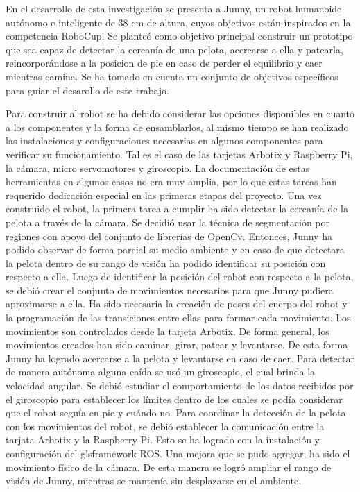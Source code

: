 En el desarrollo de esta investigaci\'on se presenta a Junny, un robot humanoide aut\'onomo e inteligente de 38 cm de altura, cuyos objetivos están inspirados en la competencia RoboCup. Se planteó como objetivo principal construir un prototipo que sea capaz de detectar la cercanía de una pelota, acercarse a ella y patearla, reincorpor\'andose a la posicion de pie en caso de perder el equilibrio y caer mientras camina. Se ha tomado en cuenta un conjunto de objetivos específicos para guiar el desarollo de este trabajo. %

Para construir al robot se ha debido considerar las opciones disponibles en cuanto a los componentes y la forma de ensamblarlos, al mismo tiempo se han realizado las instalaciones y configuraciones necesarias en algunos componentes para verificar su funcionamiento. Tal es el caso de las tarjetas Arbotix y Raspberry Pi, la cámara, micro servomotores y giroscopio. La documentación de estas herramientas en algunos casos no era muy amplia, por lo que estas tareas han requerido dedicación especial en las primeras etapas del proyecto. 
Una vez construido el robot, la primera tarea a cumplir ha sido detectar la cercanía de la pelota a través de la cámara. Se decidió usar la técnica de segmentación por regiones con apoyo del conjunto de librerías de OpenCv. Entonces, Junny ha podido observar de forma parcial su medio ambiente y en caso de que detectara la pelota dentro de su rango de visión ha podido identificar su posición con respecto a ella. 
Luego de identificar la posición del robot con respecto a la pelota, se debió crear el conjunto de movimientos necesarios para que Junny pudiera aproximarse a ella. Ha sido necesaria la creación de poses del cuerpo del robot y la programación de las transiciones entre ellas para formar cada movimiento. Los movimientos son controlados desde la tarjeta Arbotix. De forma general, los movimientos creados han sido caminar, girar, patear y levantarse. De esta forma Junny ha logrado acercarse a la pelota y levantarse en caso de caer. Para detectar de manera autónoma alguna caída se usó un giroscopio, el cual brinda la velocidad angular. Se debió estudiar el comportamiento de los datos recibidos por el giroscopio para establecer los límites dentro de los cuales se podía considerar que el robot seguía en pie y cuándo no.
Para coordinar la detección de la pelota con los movimientos del robot, se debió establecer la comunicación entre la tarjata Arbotix y la Raspberry Pi. Esto se ha logrado con la instalación y configuración del gls{framework} ROS. 
Una mejora que se pudo agregar, ha sido el movimiento físico de la cámara. De esta manera se logró ampliar el rango de visión de Junny, mientras se mantenía sin desplazarse en el ambiente.

